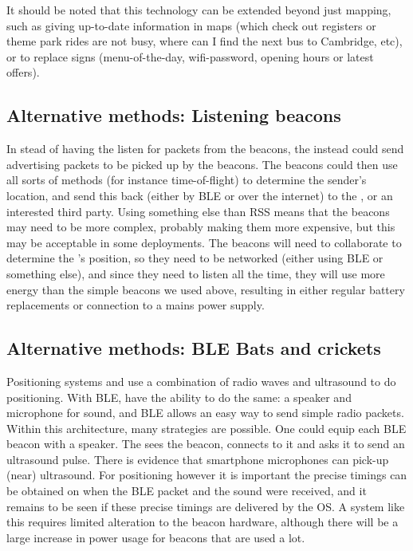 It should be noted that this technology can be extended beyond just mapping, such as giving up-to-date information in maps (which check out registers or theme park rides are not busy, where can I find the next bus to Cambridge, etc), or to replace signs (menu-of-the-day, wifi-password, opening hours or latest offers). 


\subsection{Alternative methods: Listening beacons}
In stead of having the \device listen for packets from the beacons, the \device instead could send advertising packets to be picked up by the beacons.
The beacons could then use all sorts of methods (for instance time-of-flight) to determine the sender's location, and send this back (either by BLE or over the internet) to the \device, or an interested third party.
Using something else than RSS means that the beacons may need to be more complex, probably making them more expensive, but this may be acceptable in some deployments.
The beacons will need to collaborate to determine the \device's position, so they need to be networked (either using BLE or something else), and since they need to listen all the time, they will use more energy than the simple beacons we used above, resulting in either regular battery replacements or connection to a mains power supply.

\subsection{Alternative methods: BLE Bats and crickets}
Positioning systems \citep{harter2002anatomy} and \citep{priyantha2000cricket} use a combination of radio waves and ultrasound to do positioning.
With BLE, \device have the ability to do the same: a speaker and microphone for sound, and BLE allows \apps an easy way to send simple radio packets.
Within this architecture, many strategies are possible.
One could equip each BLE beacon with a speaker.
The \device sees the beacon, connects to it and asks it to send an ultrasound pulse.
There is evidence that smartphone microphones can pick-up (near) ultrasound\citep{arentz2011near,bihler2011smartguide}.
For positioning however it is important the precise timings can be obtained on when the BLE packet and the sound were received, and it remains to be seen if these precise timings are delivered by the OS.
A system like this requires limited alteration to the beacon hardware, although there will be a large increase in power usage for beacons that are used a lot.
